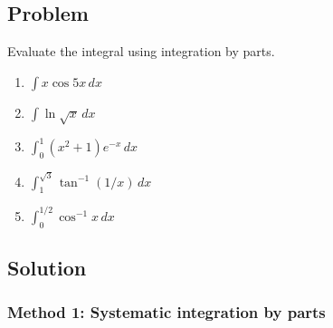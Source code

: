 \documentclass[12pt]{article}
\begin{document}
\subsection*{Problem}
Evaluate the integral using integration by parts.
\begin{enumerate}[label=(\alph*)]
\item \(\displaystyle \int x\cos 5x\,dx\)
\item \(\displaystyle \int \ln \sqrt{x}\,dx\)
\item \(\displaystyle \int_{0}^{1} (x^{2}+1)e^{-x}\,dx\)
\item \(\displaystyle \int_{1}^{\sqrt{3}} \tan^{-1}(1/x)\,dx\)
\item \(\displaystyle \int_{0}^{1/2} \cos^{-1} x\,dx\)
\end{enumerate}

\subsection*{Solution}

\subsubsection*{Method 1: Systematic integration by parts}
\end{document}
